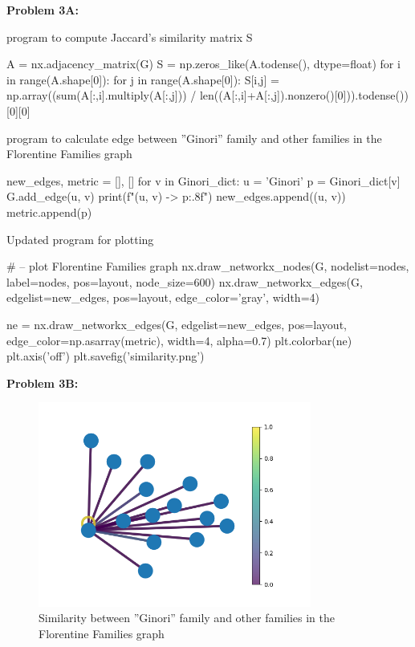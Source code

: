 \documentclass[11pt]{article}
\begin{document}
\clearpage

\textbf{Problem 3A:}

program to compute Jaccard’s similarity matrix S

\begin{python}
A = nx.adjacency_matrix(G)
S = np.zeros_like(A.todense(), dtype=float)
for i in range(A.shape[0]):
    for j in range(A.shape[0]):
        S[i,j] = np.array((sum(A[:,i].multiply(A[:,j])) /
        len((A[:,i]+A[:,j]).nonzero()[0])).todense())[0][0]
\end{python}

program to calculate edge between ”Ginori” family and other families in the Florentine Families graph

\begin{python}

new_edges, metric = [], []
for v in Ginori_dict:
    u = 'Ginori'
    p = Ginori_dict[v]
    G.add_edge(u, v)
    print(f"({u}, {v}) -> {p:.8f}")
    new_edges.append((u, v))
    metric.append(p)

\end{python}

Updated program for plotting

\begin{python}

# -- plot Florentine Families graph
nx.draw_networkx_nodes(G, nodelist=nodes, label=nodes, pos=layout, node_size=600)
nx.draw_networkx_edges(G, edgelist=new_edges, pos=layout, edge_color='gray', width=4)

ne = nx.draw_networkx_edges(G, edgelist=new_edges, pos=layout, edge_color=np.asarray(metric), width=4, alpha=0.7)
plt.colorbar(ne)
plt.axis('off')
plt.savefig('similarity.png')

\end{python}


\clearpage

\textbf{Problem 3B:}

\begin{figure}[!h]
    \centering
    \includegraphics[width = 0.8\textwidth]{similarity.png}
    \caption{Similarity between ”Ginori” family and other families in the Florentine Families graph}
    \label{fig:my_label}
\end{figure}

\clearpage
\end{document}
